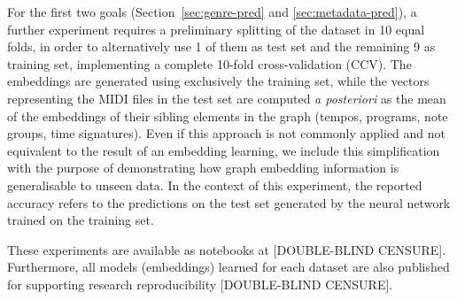 \documentclass{article}
\newcommand{\secref}[1]{\mbox{Section~\ref{#1}}}
\begin{document}
For the first two goals (\secref{sec:genre-pred} and \ref{sec:metadata-pred}), a further experiment requires a preliminary splitting of the dataset in 10 equal folds, in order to alternatively use 1 of them as test set and the remaining 9 as training set, implementing a complete 10-fold cross-validation (CCV). The embeddings are generated using exclusively the training set, while the vectors representing the MIDI files in the test set are computed \textit{a posteriori} as the mean of the embeddings of their sibling elements in the graph (tempos, programs, note groups, time signatures). Even if this approach is not commonly applied and not equivalent to the result of an embedding learning, we include this simplification with the purpose of demonstrating how graph embedding information is generalisable to unseen data. In the context of this experiment, the reported accuracy refers to the predictions on the test set generated by the neural network trained on the training set.

These experiments are available as notebooks at [DOUBLE-BLIND CENSURE].
Furthermore, all models (embeddings) learned for each dataset are also published for supporting research reproducibility [DOUBLE-BLIND CENSURE].
\end{document}
